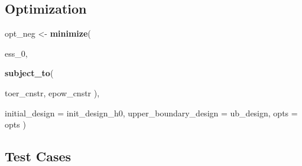 \documentclass[
]{book}
\newenvironment{Shaded}{\begin{snugshade}}{\end{snugshade}}
\newcommand{\DataTypeTok}[1]{\textcolor[rgb]{0.13,0.29,0.53}{#1}}
\newcommand{\DecValTok}[1]{\textcolor[rgb]{0.00,0.00,0.81}{#1}}
\newcommand{\FloatTok}[1]{\textcolor[rgb]{0.00,0.00,0.81}{#1}}
\newcommand{\KeywordTok}[1]{\textcolor[rgb]{0.13,0.29,0.53}{\textbf{#1}}}
\newcommand{\NormalTok}[1]{#1}
\newcommand{\OperatorTok}[1]{\textcolor[rgb]{0.81,0.36,0.00}{\textbf{#1}}}
\newcommand{\StringTok}[1]{\textcolor[rgb]{0.31,0.60,0.02}{#1}}
\begin{document}
\begin{Shaded}
\end{Shaded}

\hypertarget{optimization-4}{%
\subsection{Optimization}\label{optimization-4}}

\begin{Shaded}
\begin{Highlighting}[]
\NormalTok{opt_neg <-}\StringTok{ }\KeywordTok{minimize}\NormalTok{(}
  
\NormalTok{        ess_}\DecValTok{0}\NormalTok{,}
        
        \KeywordTok{subject_to}\NormalTok{(}
          
\NormalTok{            toer_cnstr,}
\NormalTok{            epow_cnstr}
\NormalTok{        ),}
        
        \DataTypeTok{initial_design =}\NormalTok{ init_design_h0,}
        \DataTypeTok{upper_boundary_design =}\NormalTok{ ub_design,}
        \DataTypeTok{opts =}\NormalTok{ opts}
\NormalTok{)}
\end{Highlighting}
\end{Shaded}

\hypertarget{test-cases-4}{%
\subsection{Test Cases}\label{test-cases-4}}
\end{document}
